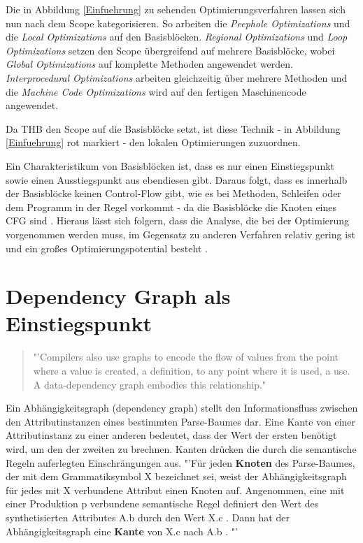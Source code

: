 Die in Abbildung \ref{Einfuehrung} zu sehenden Optimierungsverfahren lassen sich nun nach dem Scope kategorisieren. So arbeiten die \textit{Peephole Optimizations} und die \textit{Local Optimizations} auf den Basisblöcken. \textit{Regional Optimizations} und \textit{Loop Optimizations} setzen den Scope übergreifend auf mehrere Basisblöcke, wobei \textit{Global Optimizations} auf komplette Methoden angewendet werden. \textit{Interprocedural Optimizations} arbeiten gleichzeitig über mehrere Methoden und die \textit{Machine Code Optimizations} wird auf den fertigen Maschinencode angewendet.

Da \ac{THB} den Scope auf die Basisblöcke setzt, ist diese Technik - in Abbildung \ref{Einfuehrung} rot markiert - den lokalen Optimierungen zuzuordnen.

Ein Charakteristikum von Basisblöcken ist, dass es nur einen Einstiegspunkt sowie einen Ausstiegspunkt aus ebendiesen gibt. Daraus folgt, dass es innerhalb der Basisblöcke keinen Control-Flow gibt, wie es bei Methoden, Schleifen oder dem Programm in der Regel vorkommt - da die Basisblöcke die Knoten eines \ac{CFG} sind \cite{Allen:1970:CFA:390013.808479}. Hieraus lässt sich folgern, dass die Analyse, die bei der Optimierung vorgenommen werden muss, im Gegensatz zu anderen Verfahren relativ gering ist und ein großes Optimierungspotential besteht \cite{HeBIS-309344573}.


\section{Dependency Graph als Einstiegspunkt}
\begin{quotation}
	"'Compilers also use graphs to encode the flow of values from the point where a value is created, a definition, to any point where it is used, a use. A data-dependency graph embodies this relationship." \cite{HeBIS-309344573}
\end{quotation}
Ein Abhängigkeitsgraph (dependency graph) stellt den Informationsfluss zwischen den Attributinstanzen eines bestimmten Parse-Baumes dar. Eine Kante von einer Attributinstanz zu einer anderen bedeutet, dass der Wert der ersten benötigt wird, um den der zweiten zu brechnen. Kanten drücken die durch die semantische Regeln auferlegten Einschrängungen aus. "'Für jeden \textbf{Knoten} des Parse-Baumes, der mit dem Grammatiksymbol X bezeichnet sei, weist der Abhängigkeitsgraph für jedes mit X verbundene Attribut einen Knoten auf. Angenommen, eine mit einer Produktion p verbundene semantische Regel definiert den Wert des synthetisierten Attributes A.b durch den Wert X.c . Dann hat der Abhängigkeitsgraph eine \textbf{Kante} von X.c nach A.b . \cite{HeBIS-194410269}"' 

